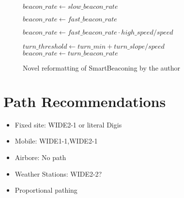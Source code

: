 \begin{figure}[p]
\begin{algorithmic}
	\State $beacon\_rate\gets slow\_beacon\_rate$

\Else
		\State $beacon\_rate\gets fast\_beacon\_rate$    

	\Else
		\State $beacon\_rate\gets fast\_beacon\_rate \cdot high\_speed / speed$

	\EndIf


	\State $turn\_threshold\gets turn\_min + turn\_slope / speed$
		\State $beacon\_rate\gets turn\_beacon\_rate$

	\EndIf
\EndIf

	\State {}

\EndIf
\end{algorithmic}
\caption{Novel reformatting of SmartBeaconing by the author}
\label{fig:kwfsmartbeacon}
\end{figure}


\section{Path Recommendations}

\begin{itemize}
\item Fixed site: WIDE2-1 or literal Digis
\item Mobile: WIDE1-1,WIDE2-1
\item Airbore: No path
\item Weather Stations: WIDE2-2?
\item Proportional pathing
\end{itemize}

